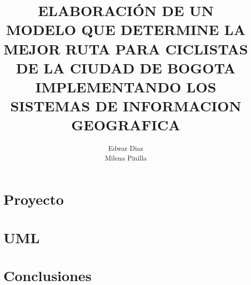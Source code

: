 \documentclass[11pt]{book}
\title{ELABORACIÓN DE UN MODELO QUE DETERMINE LA MEJOR RUTA PARA CICLISTAS DE LA CIUDAD DE BOGOTA  IMPLEMENTANDO LOS SISTEMAS DE INFORMACION GEOGRAFICA}
\author{Edwar Diaz \\ Milena Pinilla}
\begin{document}
	\maketitle
	\tableofcontents
\part{Proyecto}

\part{UML}


\part{Conclusiones}

\end{document}

